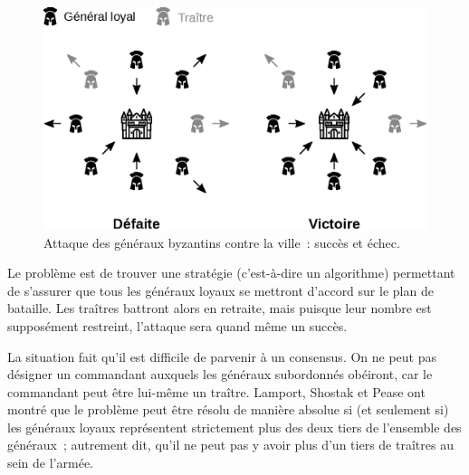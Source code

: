 \begin{figure}[h]
  \centering
  \includegraphics[scale=0.7]{img/byzantine-generals-attack.eps}
  \caption{Attaque des généraux byzantins contre la ville~: succès et échec.}
  \label{fig:byzantine-generals-attack}
\end{figure}

Le problème est de trouver une stratégie (c'est-à-dire un algorithme) permettant de s'assurer que tous les généraux loyaux se mettront d'accord sur le plan de bataille. Les traîtres battront alors en retraite, mais puisque leur nombre est supposément restreint, l'attaque sera quand même un succès.

La situation fait qu'il est difficile de parvenir à un consensus. On ne peut pas désigner un commandant auxquels les généraux subordonnés obéiront, car le commandant peut être lui-même un traître. Lamport, Shostak et Pease ont montré que le problème peut être résolu de manière absolue si (et seulement si) les généraux loyaux représentent strictement plus des deux tiers de l'ensemble des généraux~; autrement dit, qu'il ne peut pas y avoir plus d'un tiers de traîtres au sein de l'armée.


